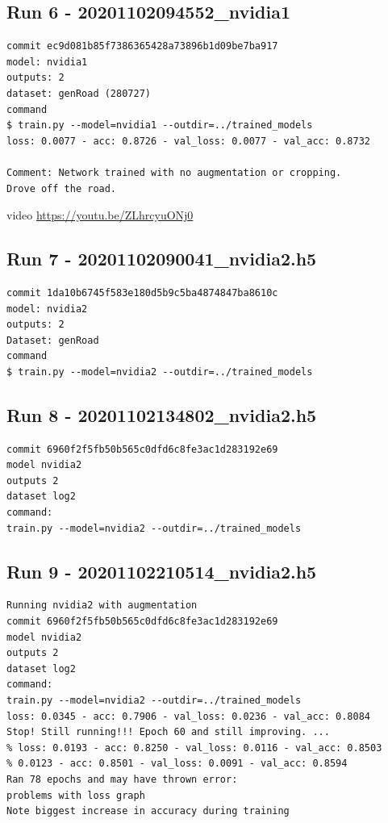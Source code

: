 \subsection{Run 6 - 20201102094552\_nvidia1}
\begin{verbatim}
commit ec9d081b85f7386365428a73896b1d09be7ba917
model: nvidia1
outputs: 2
dataset: genRoad (280727)
command
$ train.py --model=nvidia1 --outdir=../trained_models
loss: 0.0077 - acc: 0.8726 - val_loss: 0.0077 - val_acc: 0.8732

Comment: Network trained with no augmentation or cropping.
Drove off the road.

\end{verbatim}
video \url{https://youtu.be/ZLhrcyuONj0}

\subsection{Run 7 - 20201102090041\_nvidia2.h5}
\begin{verbatim}
commit 1da10b6745f583e180d5b9c5ba4874847ba8610c
model: nvidia2
outputs: 2
Dataset: genRoad
command
$ train.py --model=nvidia2 --outdir=../trained_models
\end{verbatim}

\subsection{Run 8 - 20201102134802\_nvidia2.h5}
\begin{verbatim}
commit 6960f2f5fb50b565c0dfd6c8fe3ac1d283192e69
model nvidia2
outputs 2
dataset log2
command:
train.py --model=nvidia2 --outdir=../trained_models
\end{verbatim}


\subsection{Run 9 - 20201102210514\_nvidia2.h5}
\begin{verbatim}
Running nvidia2 with augmentation
commit 6960f2f5fb50b565c0dfd6c8fe3ac1d283192e69
model nvidia2
outputs 2
dataset log2
command:
train.py --model=nvidia2 --outdir=../trained_models
loss: 0.0345 - acc: 0.7906 - val_loss: 0.0236 - val_acc: 0.8084
Stop! Still running!!! Epoch 60 and still improving. ...
% loss: 0.0193 - acc: 0.8250 - val_loss: 0.0116 - val_acc: 0.8503
% 0.0123 - acc: 0.8501 - val_loss: 0.0091 - val_acc: 0.8594
Ran 78 epochs and may have thrown error:
problems with loss graph
Note biggest increase in accuracy during training
\end{verbatim}

